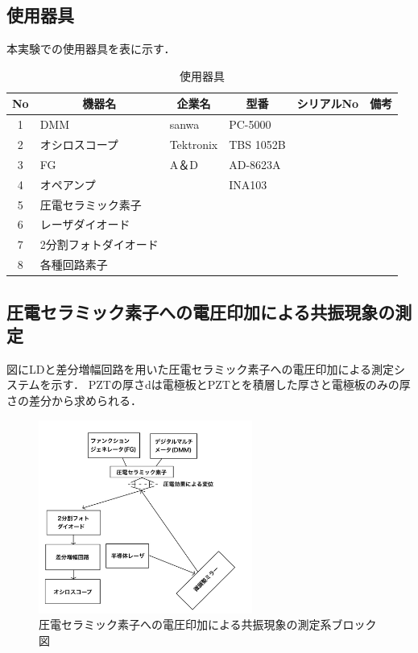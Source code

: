 \documentclass{ltjsarticle}
\begin{document}
	\subsection{使用器具}
		本実験での使用器具を表に示す．
		\begin{table}[H]
		\begin{center}
		\caption{使用器具}
		\label{tab:used}
		\begin{tabular}{clllll} \toprule
		No&\multicolumn{1}{c}{機器名}&\multicolumn{1}{c}{企業名}&\multicolumn{1}{c}{型番}&\multicolumn{1}{c}{シリアルNo}&\multicolumn{1}{c}{備考}\\
		\hline
		1&DMM&sanwa&PC-5000&\\
		2&オシロスコープ&Tektronix&TBS 1052B&\\
		3&FG&A＆D&AD-8623A&\\
		4&オペアンプ&&INA103&\\
		5&圧電セラミック素子&&&\\
		6&レーザダイオード&&&\\
		7&2分割フォトダイオード&&&\\
		8&各種回路素子&&&\\
		\bottomrule
		\end{tabular}
		\end{center}
		\end{table}

	\subsection{圧電セラミック素子への電圧印加による共振現象の測定}
		図にLDと差分増幅回路を用いた圧電セラミック素子への電圧印加による測定システムを示す．
		PZTの厚さdは電極板とPZTとを積層した厚さと電極板のみの厚さの差分から求められる．
		\begin{figure}[H]
		\centering
		\includegraphics[width = 7cm]{figs/IMG_0321.JPG}
		\caption{圧電セラミック素子への電圧印加による共振現象の測定系ブロック図}
		\label{fig:圧電セラミック素子測定系}
		\end{figure}
\end{document}
